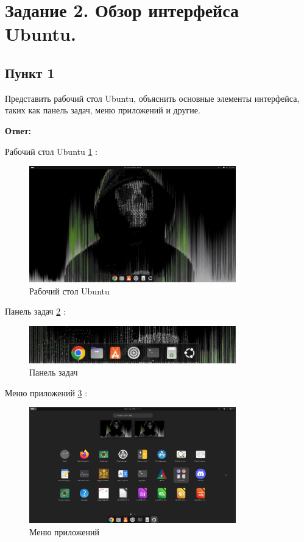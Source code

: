 \section{Задание 2. Обзор интерфейса Ubuntu.}

\subsection{Пункт 1}

Представить рабочий стол Ubuntu, объяснить основные элементы интерфейса, таких как панель задач, меню приложений и другие.

\textbf{Ответ:}

Рабочий стол Ubuntu \ref{fig:desktopUbuntu} :

\begin{figure}[!h]
    \centering
    \includegraphics[width = 0.8\textwidth]{images/desktopUbuntu.png}
    
    \caption{Рабочий стол Ubuntu}
    
    \label{fig:desktopUbuntu}
\end{figure}

Панель задач \ref{fig:taskPanel} :

\begin{figure}[!h]
    \centering
    \includegraphics[width = 0.8\textwidth]{images/taskPanel.png}
    
    \caption{Панель задач}
    
    \label{fig:taskPanel}
\end{figure}


Меню приложений \ref{fig:menuApplications} :

\begin{figure}[!h]
    \centering
    \includegraphics[width = 0.8\textwidth]{images/menuApplications.png}
    
    \caption{Меню приложений}
    
    \label{fig:menuApplications}
\end{figure}

